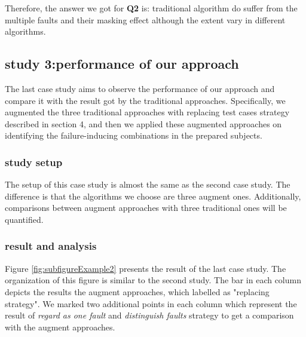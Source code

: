 \documentclass{sig-alternate}
\begin{document}
%

Therefore, the answer we got for \textbf{Q2} is: traditional algorithm do suffer from the multiple faults and their masking effect although the extent vary in different algorithms.

\subsection{study 3:performance of our approach}
The last case study aims to observe the performance of our approach and compare it with the result got by the traditional approaches. Specifically, we augmented the three traditional approaches with replacing test cases strategy described in section 4, and then we applied these augmented approaches on identifying the failure-inducing combinations in the prepared subjects.

\subsubsection{study setup}
The setup of this case study is almost the same as the second case study. The difference is that the algorithms we choose are three augment ones. Additionally, comparisons between augment approaches with three traditional ones will be quantified.

\subsubsection{result and analysis}
Figure \ref{fig:subfigureExample2} presents the result of the last case study. The organization of this figure is similar to the second study. The bar in each column depicts the results the augment approaches, which labelled as "replacing strategy". We marked two additional points in each column which represent the result of \emph{regard as one fault} and \emph{distinguish faults} strategy to get a comparison with the augment approaches.

\end{document}
